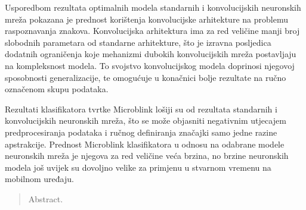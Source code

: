 \documentclass[lmodern, utf8, diplomski, numeric]{fer}
\begin{document}
Usporedbom rezultata optimalnih modela standarnih i konvolucijskih neuronskih mreža pokazana je prednost korištenja konvolucijske arhitekture na problemu raspoznavanja znakova. Konvolucijska arhitektura ima za red veličine manji broj slobodnih parametara od standarne arhitekture, što je izravna posljedica dodatnih ograničenja koje mehanizmi dubokih konvolucijskih mreža postavljaju na kompleksnost modela. To svojstvo konvolucijskog modela doprinosi njegovoj sposobnosti generalizacije, te omogućuje u konačnici bolje rezultate na ručno označenom skupu podataka.

Rezultati klasifikatora tvrtke Microblink lošiji su od rezultata standarnih i konvolucijskih neuronskih mreža, što se može objasniti negativnim utjecajem predprocesiranja podataka i ručnog definiranja značajki samo jedne razine apstrakcije. Prednost Microblink klasifikatora u odnosu na odabrane modele neuronskih mreža je njegova za red veličine veća brzina, no brzine neuronskih modela još uvijek su dovoljno velike za primjenu u stvarnom vremenu na mobilnom uređaju. 




\begin{sazetak}


\end{sazetak}

\begin{abstract}
Abstract.

\end{abstract}
\end{document}
